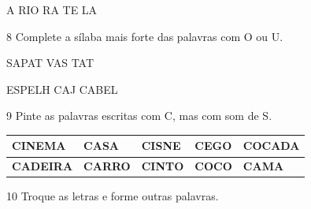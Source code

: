 \begin{center}
A  RIO \hspace{2cm} RA  TE \hspace{2cm}  LA
\end{center}

\num{8} Complete a sílaba mais forte das palavras com O ou U.

\vspace*{+2em}


SAPAT  \hspace{3cm} VAS  \hspace{2cm} TAT 

ESPELH  \hspace{1cm} CAJ  \hspace{2cm} CABEL 

\num{9} Pinte as palavras escritas com C, mas com som de S.

\vspace*{+1em}


\begin{longtable}[]{@{}lllll@{}}
\toprule
\textbf{CINEMA} & \textbf{CASA} & \textbf{CISNE} & \textbf{CEGO} &
\textbf{COCADA}\tabularnewline
\midrule
\endhead
\textbf{CADEIRA} & \textbf{CARRO} & \textbf{CINTO } & \textbf{COCO} &
\textbf{CAMA}\tabularnewline
\bottomrule
\end{longtable}

\num{10} Troque as letras e forme outras palavras.


